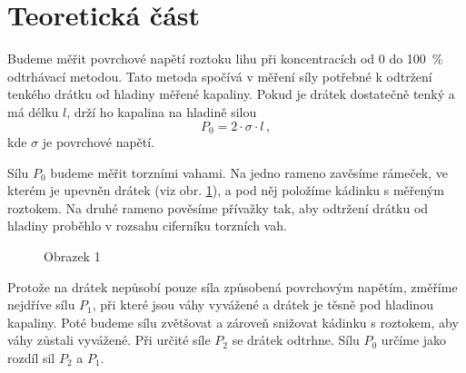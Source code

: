 \section*{Teoretická část}
Budeme měřit povrchové napětí roztoku lihu při koncentracích od 0 do \SI{100}{\percent} odtrhávací metodou.
Tato metoda spočívá v měření síly potřebné k odtržení tenkého drátku od hladiny měřené kapaliny.
Pokud je drátek dostatečně tenký a má délku $l$, drží ho kapalina na hladině silou \cite{ZFP}
\begin{equation} \label{eq::p0sigma}
P_0=2 \cdot \sigma \cdot l \,,
\end{equation}
kde $\sigma$ je povrchové napětí.

Sílu $P_0$ budeme měřit torzními vahami.
Na jedno rameno zavěsíme rámeček, ve kterém je upevněn drátek (viz obr. \ref{obr::ramecek}), a pod něj položíme kádinku s měřeným roztokem.
Na druhé rameno pověsíme přívažky tak, aby odtržení drátku od hladiny proběhlo v rozsahu ciferníku torzních vah.

\begin{figure}[htbp]
\centering
\caption{Obrazek 1}
\label{obr::ramecek}
\end{figure}

Protože na drátek nepůsobí pouze síla způsobená povrchovým napětím, změříme nejdříve sílu $P_1$, při které jsou váhy vyvážené a drátek je těsně pod hladinou kapaliny.
Poté budeme sílu zvětšovat a zároveň snižovat kádinku s roztokem, aby váhy zůstali vyvážené.
Při určité síle $P_2$ se drátek odtrhne.
Sílu $P_0$ určíme jako rozdíl sil $P_2$ a $P_1$.